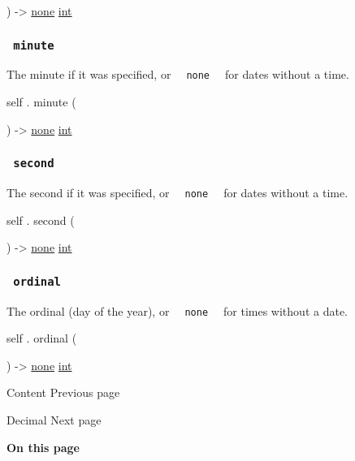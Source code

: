 ) -\textgreater{} \href{/docs/reference/foundations/none/}{none}
\href{/docs/reference/foundations/int/}{int}

\subsubsection{\texorpdfstring{\texttt{\ minute\ }}{ minute }}\label{definitions-minute}

The minute if it was specified, or
\texttt{\ }{\texttt{\ none\ }}\texttt{\ } for dates without a time.

self { . } { minute } (

) -\textgreater{} \href{/docs/reference/foundations/none/}{none}
\href{/docs/reference/foundations/int/}{int}

\subsubsection{\texorpdfstring{\texttt{\ second\ }}{ second }}\label{definitions-second}

The second if it was specified, or
\texttt{\ }{\texttt{\ none\ }}\texttt{\ } for dates without a time.

self { . } { second } (

) -\textgreater{} \href{/docs/reference/foundations/none/}{none}
\href{/docs/reference/foundations/int/}{int}

\subsubsection{\texorpdfstring{\texttt{\ ordinal\ }}{ ordinal }}\label{definitions-ordinal}

The ordinal (day of the year), or
\texttt{\ }{\texttt{\ none\ }}\texttt{\ } for times without a date.

self { . } { ordinal } (

) -\textgreater{} \href{/docs/reference/foundations/none/}{none}
\href{/docs/reference/foundations/int/}{int}

\href{/docs/reference/foundations/content/}{\pandocbounded{}}

{ Content } { Previous page }

\href{/docs/reference/foundations/decimal/}{\pandocbounded{}}

{ Decimal } { Next page }

\textbf{On this page}

